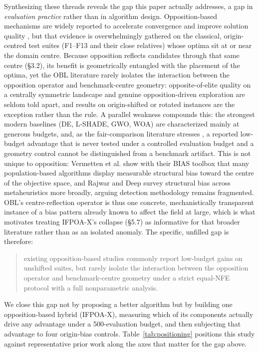 \documentclass[preprint,12pt]{elsarticle}
\begin{document}
Synthesizing these threads reveals the gap this paper actually addresses, a gap in \emph{evaluation practice} rather than in algorithm design. Opposition-based mechanisms are widely reported to accelerate convergence and improve solution quality \cite{tizhoosh2005opposition}, but that evidence is overwhelmingly gathered on the classical, origin-centred test suites (F1--F13 and their close relatives) whose optima sit at or near the domain centre. Because opposition reflects candidates through that same centre (\S3.2), its benefit is geometrically entangled with the placement of the optima, yet the OBL literature rarely isolates the interaction between the opposition operator and benchmark-centre geometry: opposite-of-elite quality on a centrally symmetric landscape and genuine opposition-driven exploration are seldom told apart, and results on origin-shifted or rotated instances are the exception rather than the rule. A parallel weakness compounds this: the strongest modern baselines (DE, L-SHADE, GWO, WOA) are characterized mainly at generous budgets, and, as the fair-comparison literature stresses \cite{wolpert1997no,sorensen2015metaheuristics}, a reported low-budget advantage that is never tested under a controlled evaluation budget and a geometry control cannot be distinguished from a benchmark artifact. This is not unique to opposition: Vermetten et al. \cite{vermetten2022bias} show with their BIAS toolbox that many population-based algorithms display measurable structural bias toward the centre of the objective space, and Rajwar and Deep \cite{rajwar2025structural} survey structural bias across metaheuristics more broadly, arguing detection methodology remains fragmented. OBL's centre-reflection operator is thus one concrete, mechanistically transparent instance of a bias pattern already known to affect the field at large, which is what motivates treating IFPOA-X's collapse (\S5.7) as informative for that broader literature rather than as an isolated anomaly. The specific, unfilled gap is therefore:

\begin{quote}
existing opposition-based studies commonly report low-budget gains on unshifted suites, but rarely isolate the interaction between the opposition operator and benchmark-centre geometry under a strict equal-NFE protocol with a full nonparametric analysis.
\end{quote}

We close this gap not by proposing a better algorithm but by building one opposition-based hybrid (IFPOA-X), measuring which of its components actually drive any advantage under a 500-evaluation budget, and then subjecting that advantage to four origin-bias controls. Table~\ref{tab:positioning} positions this study against representative prior work along the axes that matter for the gap above.
\end{document}

